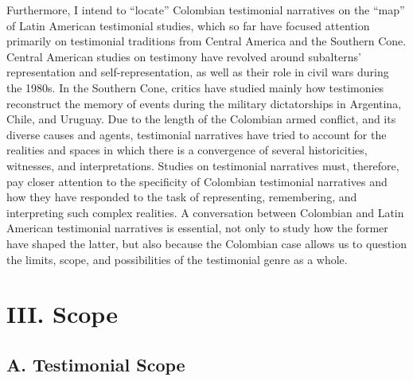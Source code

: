 \documentclass[
  11pt,
,
onecolumn,
openany
]{book}
\begin{document}
Furthermore, I intend to ``locate'' Colombian testimonial narratives on the
``map'' of Latin American testimonial studies, which so far have focused
attention primarily on testimonial traditions from Central America and the
Southern Cone. Central American studies on testimony have revolved around
subalterns' representation and self-representation, as well as their role in
civil wars during the 1980s. In the Southern Cone, critics have studied mainly
how testimonies reconstruct the memory of events during the military
dictatorships in Argentina, Chile, and Uruguay. Due to the length of the
Colombian armed conflict, and its diverse causes and agents, testimonial
narratives have tried to account for the realities and spaces in which there
is a convergence of several historicities, witnesses, and interpretations.
Studies on testimonial narratives must, therefore, pay closer attention to the
specificity of Colombian testimonial narratives and how they have responded to
the task of representing, remembering, and interpreting such complex
realities. A conversation between Colombian and Latin American testimonial
narratives is essential, not only to study how the former have shaped the
latter, but also because the Colombian case allows us to question the limits,
scope, and possibilities of the testimonial genre as a whole.

\hypertarget{iii.-scope}{%
\chapter{III. Scope}\label{iii.-scope}}

\hypertarget{a.-testimonial-scope}{%
\section{A. Testimonial Scope}\label{a.-testimonial-scope}}
\end{document}
